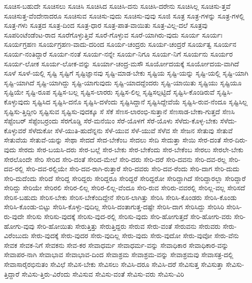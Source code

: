 {ಸೂಚಿಸ-ಬಹುದೇ
ಸೂಚಿಸಲು
ಸೂಚಿಸಿ
ಸೂಚಿಸಿದ
ಸೂಚಿಸಿ-ದನು
ಸೂಚಿಸಿ-ದರೇನು
ಸೂಚಿಸಿಲ್ಲ
ಸೂಚಿಸು-ತ್ತವೆ
ಸೂಚಿಸುತ್ತ-ವೆಂದೇನಾದರೂ
ಸೂಚಿಸುವ
ಸೂಚಿಸು-ವುದು
ಸೂಚಿಸು-ವುವು
ಸೂಜಿ
ಸೂತ್ರ
ಸೂತ್ರ-ಗಳನ್ನು
ಸೂತ್ರ-ಗಳಲ್ಲಿ
ಸೂತ್ರ-ಗಳು
ಸೂತ್ರದ
ಸೂತ್ರ-ದಿಂದ
ಸೂತ್ರ-ಧಾರ
ಸೂತ್ರ-ಪಾತ-ವಾಯಿತು
ಸೂತ್ರ-ವಿಲ್ಲ-ದಲೆ
ಸೂತ್ರವು
ಸೂಪರಿಂಟೆಂಡೆಂಟ-ರಾದ
ಸೂರೆಗೊಳ್ಳುತ್ತಿವೆ
ಸೂರೆ-ಗೊಳ್ಳುವ
ಸೂರೆ-ಯಾಗಿರು-ವುದು
ಸೂರ್ಯ
ಸೂರ್ಯಃ
ಸೂರ್ಯಗ್ರಹಣ
ಸೂರ್ಯಗ್ರಹಣ-ವಾದು-ದರಿಂದ
ಸೂರ್ಯ-ಚಂದ್ರರು
ಸೂರ್ಯ-ಚಂದ್ರರೆ
ಸೂರ್ಯತ್ವ
ಸೂರ್ಯನ
ಸೂರ್ಯ-ನಂತಿದ್ದಾರೆ
ಸೂರ್ಯ-ನಂತೆ
ಸೂರ್ಯ-ನನ್ನೇ
ಸೂರ್ಯ-ನಿಗೂ
ಸೂರ್ಯ-ನಿಗೆ
ಸೂರ್ಯನು
ಸೂರ್ಯರ
ಸೂರ್ಯ-ಲೋಕ
ಸೂರ್ಯ-ಲೋಕ-ವನ್ನು
ಸೂರ್ಯಾ-ಚಂದ್ರ-ಮಸೌ
ಸೂರ್ಯೋದಯಕ್ಕೆ
ಸೂರ್ಯೋದಯ-ವಾಗಿದೆ
ಸೂಳೆ
ಸೂಳೆ-ಯಲ್ಲಿ
ಸೃಷ್ಟಿ
ಸೃಷ್ಟಿಗೆ
ಸೃಷ್ಟಿಜ್ಞಾನವು
ಸೃಷ್ಟಿ-ಮಾಡ-ಬೇಕು
ಸೃಷ್ಟಿಯ
ಸೃಷ್ಟಿ-ಯನ್ನು
ಸೃಷ್ಟಿ-ಯಲ್ಲಿ
ಸೃಷ್ಟಿ-ಯಾಗಿ
ಸೃಷ್ಟಿ-ಯಾಗಿದೆ
ಸೃಷ್ಟಿ-ಯಾಗಿದ್ದು
ಸೃಷ್ಟಿ-ಯಾಗುವುದು
ಸೃಷ್ಟಿ-ಯಾದದ್ದೆಂದರು
ಸೃಷ್ಟಿ-ಯಾಯಿತು
ಸೃಷ್ಟಿಯು
ಸೃಷ್ಟಿಯೂ
ಸೃಷ್ಟಿಯೇ
ಸೃಷ್ಟಿ-ರೂಪ
ಸೃಷ್ಟಿಸ-ಬಲ್ಲ
ಸೃಷ್ಟಿಸ-ಲಾರರು
ಸೃಷ್ಟಿಸ-ಲಿಲ್ಲ
ಸೃಷ್ಟಿಸಲ್ಪಟ್ಟಿದೆ
ಸೃಷ್ಟಿಸಿ-ಕೊಂಡಿರುವೆ
ಸೃಷ್ಟಿಸಿ-ಕೊಳ್ಳುವುದು
ಸೃಷ್ಟಿಸಿದ
ಸೃಷ್ಟಿಸಿ-ದನೊ
ಸೃಷ್ಟಿಸಿ-ದಳೆಂದು
ಸೃಷ್ಟಿಸಿದ್ದಾನೆ
ಸೃಷ್ಟಿಸಿದ್ದೇವೆಯೆ
ಸೃಷ್ಟಿಸಿ-ರುವ-ನೆಂದೂ
ಸೃಷ್ಟಿಸಿಲ್ಲ
ಸೃಷ್ಟಿಸು-ತ್ತಿದ್ದೀರಿ
ಸೃಷ್ಟಿಸುವ
ಸೃಷ್ಟಿಸು-ವುದಕ್ಕೂ
ಸೆ
ಸೆಕೆ
ಸೆಣಸ-ಲಾರಂಭಿ-ಸುತ್ತಾನೆ
ಸೆಣಸಾಡ-ಬೇಕಾ-ಗುತ್ತದೆ
ಸೆಣಸಿ
ಸೆಪ್ಟೆಂಬರ್
ಸೆಪ್ಟೆಂಬರ್ರಂದು
ಸೆರಗೊಡ್ಡಿ
ಸೆರೆ-ಮನೆಯಿಂ
ಸೆರೆ-ಯೊಳಗೆ
ಸೆರೆ-ಯೊಳು
ಸೆಳೆದು-ಕೊಳ್ಳ-ಬೇಕು
ಸೆಳೆದು-ಕೊಳ್ಳುವರೆ
ಸೆಳೆದುಕೋ
ಸೆಳೆ-ಯುತಿ-ಹುದೆನ್ನನು
ಸೆಳೆ-ಯುವ
ಸೆಳೆ-ಯುವೆ
ಸೆಳೆವ
ಸೇ
ಸೇಜನ
ಸೇತುವು
ಸೇತುವೆ
ಸೇತುವೆಯ
ಸೇತುವೆ-ಯನ್ನು
ಸೇಥಾ
ಸೇದದೆ
ಸೇದ-ಬೇಕೆಂಬ
ಸೇದಲು
ಸೇದಿ
ಸೇದುತ್ತಾ
ಸೇಯಿ
ಸೇರ-ದಂತೆ
ಸೇರ-ದಿರು-ವುದು
ಸೇರದು
ಸೇರ-ಬಯಸಿ-ದರು
ಸೇರ-ಬಲ್ಲೆ
ಸೇರ-ಬೇಕು
ಸೇರ-ಬೇಕೆಂದು
ಸೇರ-ಬೇಕೆಂಬ
ಸೇರಲು
ಸೇರಲೇ-ಬೇಕು
ಸೇರಲೊಂದೇ
ಸೇರಿ
ಸೇರಿದ
ಸೇರಿ-ದಂತೆ
ಸೇರಿದ-ಮೇಲೆ
ಸೇರಿ-ದರು
ಸೇರಿ-ದರೆ
ಸೇರಿ-ದವನು
ಸೇರಿ-ದವ-ರಲ್ಲ
ಸೇರಿ-ದವ-ರಲ್ಲಿ
ಸೇರಿ-ದವ-ರಲ್ಲಿಯೇ
ಸೇರಿ-ದವ-ರಾಗಿ-ರುತ್ತಾರೆ
ಸೇರಿ-ದವರು
ಸೇರಿ-ದವ-ರೆಂದು
ಸೇರಿ-ದಾಗ
ಸೇರಿ-ದುದು
ಸೇರಿ-ದುದೆಂದು
ಸೇರಿದೆ
ಸೇರಿದ್ದ
ಸೇರಿದ್ದರು
ಸೇರಿದ್ದರೂ
ಸೇರಿದ್ದರೆ
ಸೇರಿದ್ದರೋ
ಸೇರಿದ್ದಾಗಿದೆ
ಸೇರಿದ್ದಾರಲ್ಲಾ
ಸೇರಿದ್ದಾರೆ
ಸೇರಿದ್ದು
ಸೇರಿಯೇ
ಸೇರಿರಲಿ
ಸೇರಿರ-ಲಿಲ್ಲ
ಸೇರಿರ-ಲಿಲ್ಲ-ವೆಂದೂ
ಸೇರಿ-ರುವ
ಸೇರಿರು-ವವರಲ್ಲಿ
ಸೇರಿಲ್ಲ-ವಲ್ಲ
ಸೇರಿಸದೆ
ಸೇರಿಸ-ಬಹುದು
ಸೇರಿಸ-ಬೇಕು
ಸೇರಿಸ-ಬೇಕೆಂದಿದ್ದೇನೆ
ಸೇರಿಸ-ಲಾಗಿತ್ತು
ಸೇರಿಸಿ
ಸೇರಿಸಿ-ಕೊಂಡರು
ಸೇರಿಸಿ-ಕೊಂಡು
ಸೇರಿಸಿ-ಕೊಂಡು-ಬಿಟ್ಟು
ಸೇರಿಸಿ-ಕೊಳ್ಳು-ವುದಿಲ್ಲ
ಸೇರಿಸಿ-ದಂತಾಗುತ್ತ-ದಷ್ಟೇ
ಸೇರಿಸಿ-ದಾಗ
ಸೇರಿಸಿದ್ದು
ಸೇರಿಸಿರಿ
ಸೇರಿಸಿ-ರು-ವುದೇ
ಸೇರಿಸು
ಸೇರಿಸು-ವುದಕ್ಕೆ
ಸೇರಿಸು-ವುದ-ರಲ್ಲಿ
ಸೇರಿಸು-ವುದು
ಸೇರಿ-ಹೋಗುತ್ತದೆ
ಸೇರಿ-ಹೋಗು-ವರು
ಸೇರಿ-ಹೋಗು-ವುವು
ಸೇರಿ-ಹೋಯಿತು
ಸೇರುತ್ತಿತ್ತು
ಸೇರುತ್ತಿದ್ದರು
ಸೇರುವ
ಸೇರು-ವಂತೆ
ಸೇರುವನು
ಸೇರುವರು
ಸೇರು-ವಿರೆಂಬುದು
ಸೇರು-ವುದಕ್ಕೆ
ಸೇರು-ವುದರ
ಸೇರು-ವುದಿಲ್ಲ
ಸೇರು-ವುದು
ಸೇರು-ವುದೋ
ಸೇರು-ವುವೋ
ಸೇರು-ವೆನು
ಸೇವಕ
ಸೇವಕ-ನಿಗೆ
ಸೇವಕನು
ಸೇವ-ಕರ
ಸೇವಾಧರ್ಮ
ಸೇವಾಧರ್ಮ-ವನ್ನು
ಸೇವಾಧಿಕಾರ
ಸೇವಾಧಿಕಾರ-ವನ್ನು
ಸೇವಾಪರ-ನಾಗಿ
ಸೇವಾಭಾವ
ಸೇವಾಭಾವ-ದಿಂದ
ಸೇವಾಶ್ರಮ
ಸೇವಾಶ್ರಮ-ವನ್ನು
ಸೇವಾಶ್ರಮವು
ಸೇವಾಸತ್ರ-ದಲ್ಲಿ
ಸೇವಾಸಾರೈರಭಿನುತಂ
ಸೇವಿಛೆ
ಸೇವಿಸ-ಬೇಕು
ಸೇವಿಸಲು
ಸೇವಿಸಿ-ದರೂ
ಸೇವಿಸಿ-ದರೆ
ಸೇವಿಸುತ್ತ
ಸೇವಿಸುತ್ತಾ
ಸೇವಿಸು-ತ್ತಿದ್ದಾರೆ
ಸೇವಿಸು-ತ್ತಿರು-ವಿರೆಂದು
ಸೇವಿಸುವ
ಸೇವಿಸು-ವಂತೆ
ಸೇವಿಸು-ವರು
ಸೇವಿಸು-ವಿರಿ
}
